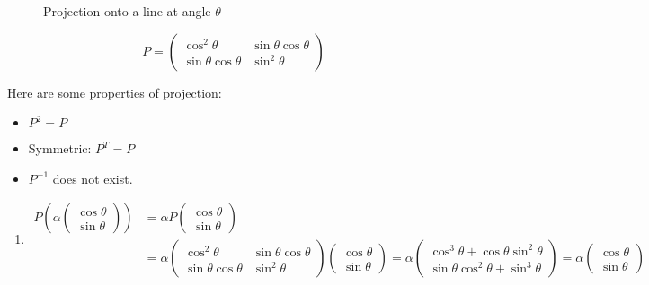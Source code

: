 \begin{enumerate}[label=$\arabic*^\circ$]
\begin{figure}[H]
\begin{tikzpicture}[>=stealth, thick, scale=1.5]
        \end{tikzpicture}
        \caption{Projection onto a line at angle $\theta$}
    \end{figure}

    \[
        P = \begin{pmatrix}
            \cos^2 \theta & \sin \theta \cos \theta \\
            \sin \theta \cos \theta & \sin^2 \theta
        \end{pmatrix}
    \]

    Here are some properties of projection:
    \begin{itemize}
        \item $P^2 = P$
        \item Symmetric: $P^T = P$
        \item $P^{-1}$ does not exist.
    \end{itemize}

    \begin{enumerate}[label=$\arabic*^\circ$]
        \item \begin{align*}
        P \left( \alpha \begin{pmatrix}
            \cos \theta \\
            \sin \theta
        \end{pmatrix}  \right) &= \alpha P \begin{pmatrix}
            \cos \theta \\
            \sin \theta
        \end{pmatrix} \\ &= \alpha \begin{pmatrix}
            \cos^2 \theta & \sin \theta \cos \theta \\
            \sin \theta \cos \theta & \sin^2 \theta
        \end{pmatrix} \begin{pmatrix}
            \cos \theta \\
            \sin \theta
        \end{pmatrix} = \alpha \begin{pmatrix}
            \cos^3 \theta + \cos \theta \sin^2 \theta \\
            \sin \theta \cos^2 \theta + \sin^3 \theta
        \end{pmatrix} = \alpha \begin{pmatrix}
            \cos \theta \\
            \sin \theta
        \end{pmatrix}
        \end{align*}


\end{enumerate}
\end{enumerate}
